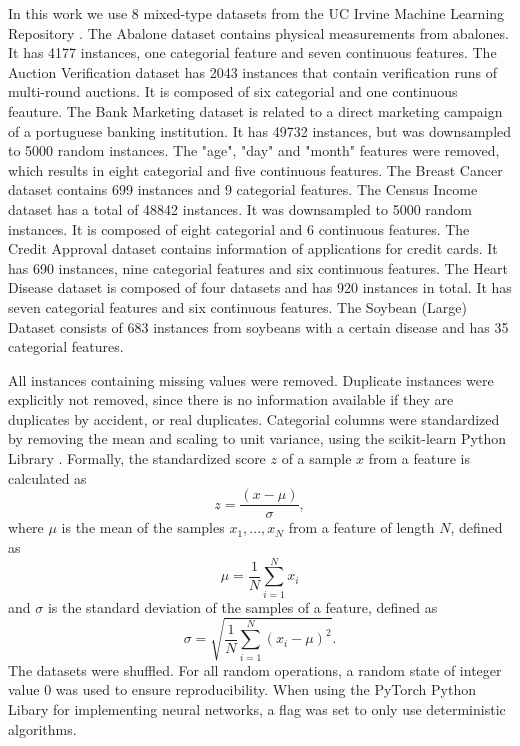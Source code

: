 In this work we use 8 mixed-type datasets from the UC Irvine Machine Learning Repository \cite{uci_ml_rpo}.
The Abalone dataset \cite{abalone} contains physical measurements from abalones. It has 4177 instances, one categorial feature and seven continuous features.
The Auction Verification dataset \cite{auction_verification} has 2043 instances that contain verification runs of multi-round auctions. It is composed of six categorial and one continuous feauture.
The Bank Marketing dataset \cite{bank_marketing} is related to a direct marketing campaign of a portuguese banking institution. It has 49732 instances, but was downsampled to 5000 random instances. The "age", "day" and "month" features were removed, which results in eight categorial and five continuous features.
The Breast Cancer dataset \cite{breast_cancer} contains 699 instances and 9 categorial features.
The Census Income dataset \cite{census_income} has a total of 48842 instances. It was downsampled to 5000 random instances. It is composed of eight categorial and 6 continuous features.
The Credit Approval dataset \cite{credit_approval} contains information of applications for credit cards. It has 690 instances, nine categorial features and six continuous features.
The Heart Disease dataset \cite{heart_disease} is composed of four datasets and has 920 instances in total. It has seven categorial features and six continuous features.
The Soybean (Large) Dataset \cite{abalone} consists of 683 instances from soybeans with a certain disease and has 35 categorial features.

All instances containing missing values were removed. Duplicate instances were explicitly not removed, since there is no information available if they are duplicates by accident, or real duplicates. Categorial columns were standardized by removing the mean and scaling to unit variance, using the scikit-learn Python Library \cite{scikit_learn}. Formally, the standardized score $z$ of a sample $x$ from a feature is calculated as
$$z = \frac{(x-\mu)}{\sigma},$$
where $\mu$ is the mean of the samples $x_1, ...,x_N$ from a feature of length $N$, defined as
$$\mu = \frac{1}{N} \sum^{N}_{i=1} x_i$$
and $\sigma$ is the standard deviation of the samples of a feature, defined as
$$\sigma = \sqrt{\frac{1}{N} \sum^{N}_{i=1}(x_i - \mu)^2}.$$
The datasets were shuffled. For all random operations, a random state of integer value 0 was used to ensure reproducibility. When using the PyTorch Python Libary \cite{pytorch} for implementing neural networks, a flag was set to only use deterministic algorithms.

